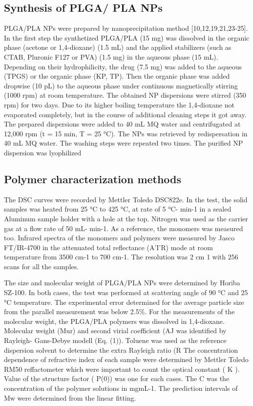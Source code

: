 \documentclass[11pt,letterpaper]{article}
\begin{document}
	\subsection{Synthesis of PLGA/ PLA NPs}
	
	PLGA/PLA NPs were prepared by nanoprecipitation method [10,12,19,21,23-25].   In   the   first   step   the   synthetized   PLGA/PLA (15 mg) was dissolved in the organic phase (acetone or 1,4-dioxane) (1.5 mL)  and  the applied stabilizers  (such as CTAB, Pluronic F127 or
	PVA) (1.5 mg) in the aqueous phase (15 mL). Depending on their hydrophilicity, the drug (7.5 mg) was added to the aqueous (TPGS) or the
	organic phase (KP, TP). Then the organic phase was added dropwise (10 pL) to the aqueous phase under continuous magnetically stirring (1000 rpm) at room temperature. The obtained NP dispersions were stirred (350 rpm) for two days. Due  to its higher boiling temperature  the 1,4-dioxane not evaporated completely, but in the course of additional cleaning steps it got away. The prepared dispersions were added to  40 mL   MQ  water   and  centrifugated  at  12,000 rpm   (t = 15  min,
	T  = 25 °C).  The  NPs  was  retrieved  by  redispersation  in  40 mL MQ
	water. The washing steps were repeated two times. The purified NP dispersion was lyophilized
	
	
	\subsection{Polymer characterization methods}
	
	The DSC curves were recorded by Mettler Toledo DSC822e. In the test,  the  solid  samples  was  heated  from  25 °C  to  425 °C,  at  rate of
	5 °C- min-1  in a sealed Aluminum sample holder with a hole at the top.
	Nitrogen was used as the carrier gas at a flow rate of 50 mL- min-1. As a reference, the monomers was measured too. Infrared spectra of the monomers  and  polymers  were  measured  by  Jasco  FT/IR-4700  in  the attenuated  total  reflectance  (A'I'R)  mode  at  room  temperature  from 3500 cm-1 to 700 cm-1. The resolution was 2 cm 1 with 256 scans for all the samples.
	
	The size and molecular weight of PLGA/PLA NPs were determined by Horiba SZ-100. In both cases, the test was performed at scattering angle  of  90 °C  and   25 °C   temperature.  The  experimental  error determined for the average particle size from the parallel measurement was below 2.5\%. For the measurements of the molecular weight, the PLGA/PLA polymers was dissolved in 1,4-dioxane. Molecular weight (Mur) and second virial coefficient (AJ was identified by Rayleigh- Gans-Debye modell (Eq. (1)). Toluene was used as the reference dispersion solvent to  determine the extra  Rayleigh  ratio  (R       The concentration dependence of refractive index of each sample were determined by Mettler Toledo RM50 reffactometer which were important
	to  count  the  optical  constant  ( K ). Value  of  the structure  factor  ( P(0))
	was one for each cases. The C was the concentration of the polymer solutions in mgmL-1. The prediction intervals of Mw were determined from the linear fitting.
	
\end{document}
